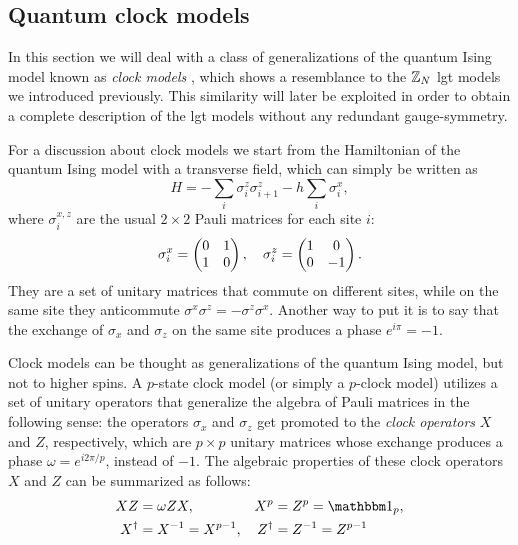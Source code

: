 \subsection{Quantum clock models}%
\label{sub:clock_models}

In this section we will deal with a class of generalizations of the quantum Ising model known as \emph{clock models} \cite{fendley2014parafermions, baxter1989clock}, which shows a resemblance to the $\mathbb{Z}_N$ \ac{lgt} models we introduced previously.
This similarity will later be exploited in order to obtain a complete description of the \ac{lgt} models without any redundant gauge-symmetry.

For a discussion about clock models we start from the Hamiltonian of the quantum Ising model with a transverse field, which can simply be written as
\begin{equation}
    H = - \sum_{i} \sigma^z_i \sigma^z_{i+1} - h \sum_{i} \sigma^x_i,
    \label{eq:ising_hamiltonian_duality}
\end{equation}
where $\sigma^{x,z}_i$ are the usual $2 \times 2$ Pauli matrices for each site $i$:
\begin{equation}
    \sigma^x_i = \pmqty{ 0 & 1 \\ 1 &  0 }, \quad
    \sigma^z_i = \pmqty{ 1 & 0 \\ 0 & -1 }.
\end{equation}
They are a set of unitary matrices that commute on different sites, while on the same site they anticommute $\sigma^x \sigma^z = - \sigma^z \sigma^x$.
Another way to put it is to say that the exchange of $\sigma_x$ and $\sigma_z$ on the same site produces a phase $e^{i \pi} = -1$.

Clock models can be thought as generalizations of the quantum Ising model, but not to higher spins.
A $p$-state clock model (or simply a $p$-clock model) utilizes a set of unitary operators that generalize the algebra of Pauli matrices in the following sense:
the operators $\sigma_x$ and $\sigma_z$ get promoted to the \emph{clock operators} $X$ and $Z$, respectively, which are $p \times p$ unitary matrices whose exchange produces a phase $\omega = e^{i 2 \pi / p}$, instead of $-1$.
The algebraic properties of these clock operators $X$ and $Z$ can be summarized as follows:
\begin{equation}
    \begin{aligned}
        X Z & = \omega Z X, &
        X^p & =  Z^p = \identity_p, \\
        X^\dagger & = X^{-1} = X^{p-1}, &
        Z^\dagger & = Z^{-1} = Z^{p-1}
    \end{aligned}
    \label{eq:clock_operator_algebra}
\end{equation}

